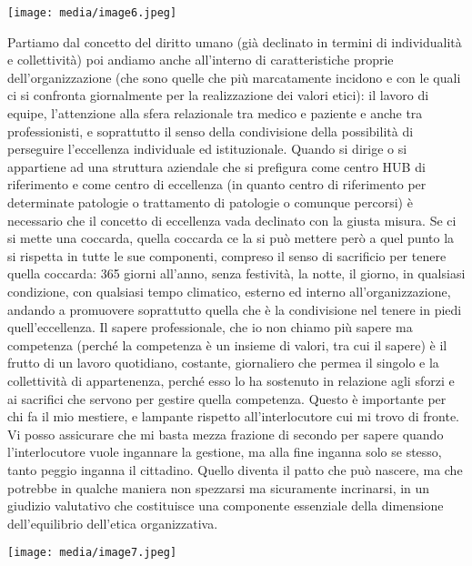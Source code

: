 \documentclass[]{article}
\begin{document}
\texttt{[image: media/image6.jpeg]}

Partiamo dal concetto del diritto umano (già declinato in termini di
individualità e collettività) poi andiamo anche all'interno di
caratteristiche proprie dell'organizzazione (che sono quelle che più
marcatamente incidono e con le quali ci si confronta giornalmente per la
realizzazione dei valori etici): il lavoro di equipe, l'attenzione alla
sfera relazionale tra medico e paziente e anche tra professionisti, e
soprattutto il senso della condivisione della possibilità di perseguire
l'eccellenza individuale ed istituzionale. Quando si dirige o si
appartiene ad una struttura aziendale che si prefigura come centro HUB
di riferimento e come centro di eccellenza (in quanto centro di
riferimento per determinate patologie o trattamento di patologie o
comunque percorsi) è necessario che il concetto di eccellenza vada
declinato con la giusta misura. Se ci si mette una coccarda, quella
coccarda ce la si può mettere però a quel punto la si rispetta in tutte
le sue componenti, compreso il senso di sacrificio per tenere quella
coccarda: 365 giorni all'anno, senza festività, la notte, il giorno, in
qualsiasi condizione, con qualsiasi tempo climatico, esterno ed interno
all'organizzazione, andando a promuovere soprattutto quella che è la
condivisione nel tenere in piedi quell'eccellenza. Il sapere
professionale, che io non chiamo più sapere ma competenza (perché la
competenza è un insieme di valori, tra cui il sapere) è il frutto di un
lavoro quotidiano, costante, giornaliero che permea il singolo e la
collettività di appartenenza, perché esso lo ha sostenuto in relazione
agli sforzi e ai sacrifici che servono per gestire quella competenza.
Questo è importante per chi fa il mio mestiere, e lampante rispetto
all'interlocutore cui mi trovo di fronte. Vi posso assicurare che mi
basta mezza frazione di secondo per sapere quando l'interlocutore vuole
ingannare la gestione, ma alla fine inganna solo se stesso, tanto peggio
inganna il cittadino. Quello diventa il patto che può nascere, ma che
potrebbe in qualche maniera non spezzarsi ma sicuramente incrinarsi, in
un giudizio valutativo che costituisce una componente essenziale della
dimensione dell'equilibrio dell'etica organizzativa.

\texttt{[image: media/image7.jpeg]}
\end{document}
